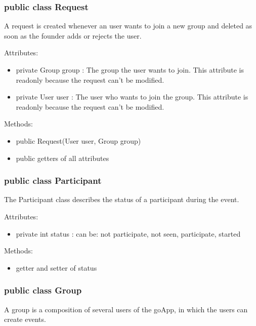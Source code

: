 	\newpage
	\subsubsection{public class Request}
	A request is created whenever an user wants to join a new group and deleted as soon as the founder adds or rejects the user.
	
	Attributes:
	\begin{itemize}
	\item private Group group : The group the user wants to join. This attribute is readonly because the request can't be modified.
	\item private User user : The user who wants to join the group. This attribute is readonly because the request can't be modified.
	\end{itemize}
	
	Methods: 
	\begin{itemize}
	\item public Request(User user, Group group)
	\item public getters of all attributes
	\end{itemize}
	


\subsubsection {public class Participant} 
 The Participant class describes the status of a participant during the event.

Attributes:
\begin{itemize}
\item	private int status : can be: not participate, not seen, participate, started
\end{itemize}

	Methods: 
	\begin{itemize}
	\item getter and setter of status
	\end{itemize}

	\newpage
	\subsubsection{public class Group}
	A group is a composition of several users of the goApp, in which the users can create events.

